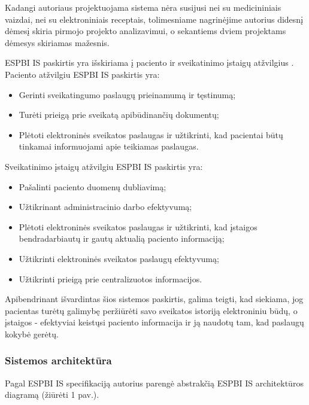Kadangi autoriaus projektuojama sistema nėra susijusi nei su medicininiais vaizdai, nei su elektroniniais receptais, tolimesniame nagrinėjime autorius didesnį dėmesį skiria pirmojo projekto analizavimui, o sekantiems dviem projektams dėmesys skiriamas mažesnis.


ESPBI IS paskirtis yra išskiriama į paciento ir sveikatinimo įstaigų atžvilgius \cite{Specifikacija}. Paciento atžvilgiu ESPBI IS paskirtis yra:
\begin{itemize}
    \item Gerinti sveikatingumo paslaugų prieinamumą ir tęstinumą;
    \item Turėti prieigą prie sveikatą apibūdinančių dokumentų;
    \item Plėtoti elektroninės sveikatos paslaugas ir užtikrinti, kad pacientai būtų tinkamai informuojami apie teikiamas paslaugas.
\end{itemize}


Sveikatinimo įstaigų atžvilgiu ESPBI IS paskirtis yra:
\begin{itemize}
    \item Pašalinti paciento duomenų dubliavimą;
    \item Užtikrinant administracinio darbo efektyvumą;
    \item Plėtoti elektroninės sveikatos paslaugas ir užtikrinti, kad įstaigos bendradarbiautų ir gautų aktualią paciento informaciją;
    \item Užtikrinti elektroninės sveikatos paslaugų efektyvumą;
    \item Užtikrinti prieigą prie centralizuotos informacijos.
\end{itemize}

Apibendrinant išvardintas šios sistemos paskirtis, galima teigti, kad siekiama, jog pacientas turėtų galimybę peržiūrėti savo sveikatos istoriją elektroniniu būdų, o įstaigos - efektyviai keistųsi paciento informacija ir ją naudotų tam, kad paslaugų kokybė gerėtų.

\subsubsection{Sistemos architektūra}

Pagal ESPBI IS specifikaciją \cite{Specifikacija} autorius parengė abstrakčią ESPBI IS architektūros diagramą (žiūrėti 1 pav.). 

